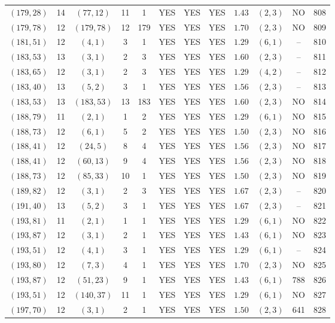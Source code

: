\begin{longtable}{|c|c|c|c|c|c|c|c|c|c|c|c|}
$(179,28)$ & 14 & $(77,12)$ & 11 & 1 & YES & YES & YES & $1.43$ & $(2,3)$ & NO & 808\\
$(179,78)$ & 12 & $(179,78)$ & 12 & 179 & YES & YES & YES & $1.70$ & $(2,3)$ & NO & 809\\
$(181,51)$ & 12 & $(4,1)$ & 3 & 1 & YES & YES & YES & $1.29$ & $(6,1)$ & -- & 810\\
$(183,53)$ & 13 & $(3,1)$ & 2 & 3 & YES & YES & YES & $1.60$ & $(2,3)$ & -- & 811\\
$(183,65)$ & 12 & $(3,1)$ & 2 & 3 & YES & YES & YES & $1.29$ & $(4,2)$ & -- & 812\\
$(183,40)$ & 13 & $(5,2)$ & 3 & 1 & YES & YES & YES & $1.56$ & $(2,3)$ & -- & 813\\
$(183,53)$ & 13 & $(183,53)$ & 13 & 183 & YES & YES & YES & $1.60$ & $(2,3)$ & NO & 814\\
$(188,79)$ & 11 & $(2,1)$ & 1 & 2 & YES & YES & YES & $1.29$ & $(6,1)$ & NO & 815\\
$(188,73)$ & 12 & $(6,1)$ & 5 & 2 & YES & YES & YES & $1.50$ & $(2,3)$ & NO & 816\\
$(188,41)$ & 12 & $(24,5)$ & 8 & 4 & YES & YES & YES & $1.56$ & $(2,3)$ & NO & 817\\
$(188,41)$ & 12 & $(60,13)$ & 9 & 4 & YES & YES & YES & $1.56$ & $(2,3)$ & NO & 818\\
$(188,73)$ & 12 & $(85,33)$ & 10 & 1 & YES & YES & YES & $1.50$ & $(2,3)$ & NO & 819\\
$(189,82)$ & 12 & $(3,1)$ & 2 & 3 & YES & YES & YES & $1.67$ & $(2,3)$ & -- & 820\\
$(191,40)$ & 13 & $(5,2)$ & 3 & 1 & YES & YES & YES & $1.67$ & $(2,3)$ & -- & 821\\
$(193,81)$ & 11 & $(2,1)$ & 1 & 1 & YES & YES & YES & $1.29$ & $(6,1)$ & NO & 822\\
$(193,87)$ & 12 & $(3,1)$ & 2 & 1 & YES & YES & YES & $1.43$ & $(6,1)$ & NO & 823\\
$(193,51)$ & 12 & $(4,1)$ & 3 & 1 & YES & YES & YES & $1.29$ & $(6,1)$ & -- & 824\\
$(193,80)$ & 12 & $(7,3)$ & 4 & 1 & YES & YES & YES & $1.70$ & $(2,3)$ & NO & 825\\
$(193,87)$ & 12 & $(51,23)$ & 9 & 1 & YES & YES & YES & $1.43$ & $(6,1)$ & 788 & 826\\
$(193,51)$ & 12 & $(140,37)$ & 11 & 1 & YES & YES & YES & $1.29$ & $(6,1)$ & NO & 827\\
$(197,70)$ & 12 & $(3,1)$ & 2 & 1 & YES & YES & YES & $1.50$ & $(2,3)$ & 641 & 828\\

\end{longtable}
